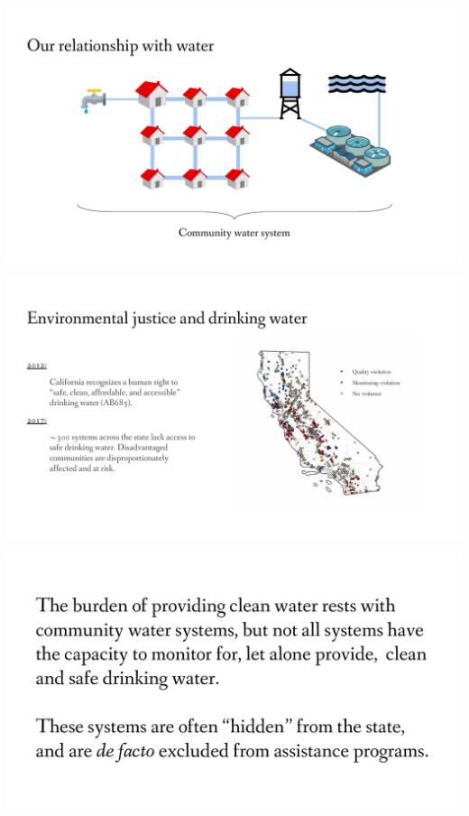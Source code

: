 \documentclass[aspectratio=169]{beamer}
\begin{document}
\begin{frame}
\includegraphics[width=1.2\textwidth]{seigi_2}
\end{frame}

\begin{frame}
\includegraphics[width=1.2\textwidth]{seigi_1}
\end{frame}

\begin{frame}
\includegraphics[width=1.1\textwidth]{seigi_3}
\end{frame}
\end{document}
